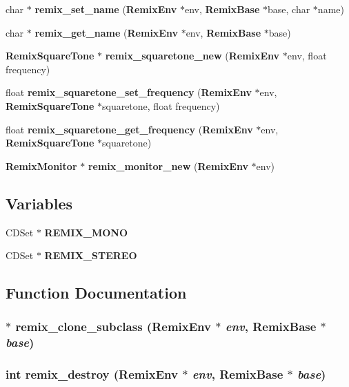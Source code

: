 \begin{CompactItemize}
\item 
char $\ast$ {\bf remix\_\-set\_\-name} ({\bf Remix\-Env} $\ast$env, {\bf Remix\-Base} $\ast$base, char $\ast$name)
\item 
char $\ast$ {\bf remix\_\-get\_\-name} ({\bf Remix\-Env} $\ast$env, {\bf Remix\-Base} $\ast$base)
\item 
{\bf Remix\-Square\-Tone} $\ast$ {\bf remix\_\-squaretone\_\-new} ({\bf Remix\-Env} $\ast$env, float frequency)
\item 
float {\bf remix\_\-squaretone\_\-set\_\-frequency} ({\bf Remix\-Env} $\ast$env, {\bf Remix\-Square\-Tone} $\ast$squaretone, float frequency)
\item 
float {\bf remix\_\-squaretone\_\-get\_\-frequency} ({\bf Remix\-Env} $\ast$env, {\bf Remix\-Square\-Tone} $\ast$squaretone)
\item 
{\bf Remix\-Monitor} $\ast$ {\bf remix\_\-monitor\_\-new} ({\bf Remix\-Env} $\ast$env)
\end{CompactItemize}
\subsection*{Variables}
\begin{CompactItemize}
\item 
CDSet $\ast$ {\bf REMIX\_\-MONO}
\item 
CDSet $\ast$ {\bf REMIX\_\-STEREO}
\end{CompactItemize}


\subsection{Function Documentation}
\subsubsection{$\ast$ remix\_\-clone\_\-subclass ({\bf Remix\-Env} $\ast$ {\em env}, {\bf Remix\-Base} $\ast$ {\em base})}\label{remix_8h_a21}


\subsubsection{\setlength{\rightskip}{0pt plus 5cm}int remix\_\-destroy ({\bf Remix\-Env} $\ast$ {\em env}, {\bf Remix\-Base} $\ast$ {\em base})}\label{remix_8h_a22}


